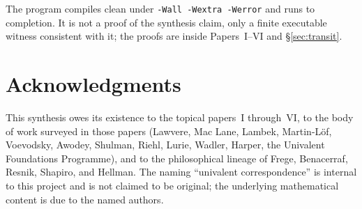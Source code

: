 \documentclass[12pt]{article}
\theoremstyle{definition}
\theoremstyle{remark}
\begin{document}
The program compiles clean under \verb|-Wall -Wextra -Werror| and runs
to completion. It is not a proof of the synthesis claim, only a
finite executable witness consistent with it; the proofs are inside
Papers~I--VI and \S\ref{sec:transit}.

\section*{Acknowledgments}

This synthesis owes its existence to the topical papers~I through~VI, to
the body of work surveyed in those papers (Lawvere, Mac Lane, Lambek,
Martin-L\"of, Voevodsky, Awodey, Shulman, Riehl, Lurie, Wadler, Harper,
the Univalent Foundations Programme), and to the philosophical lineage of
Frege, Benacerraf, Resnik, Shapiro, and Hellman. The naming
``univalent correspondence'' is internal to this project and is not
claimed to be original; the underlying mathematical content is due to the
named authors.
\end{document}
